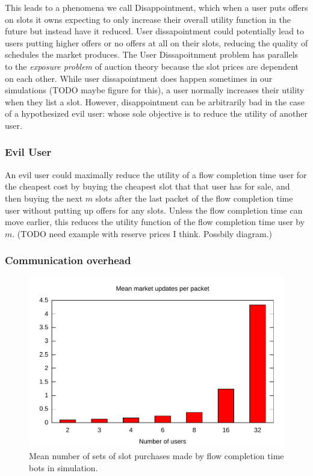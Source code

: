 This leads to a phenomena we call Disappointment, which when a user puts offers on slots it owns expecting to only increase their overall utility function in the future but instead have it reduced. User dissapointment could potentially lead to users putting higher offers or no offers at all on their slots, reducing the quality of schedules the market produces.
The User Dissapoitnment problem has parallels to the \emph{exposure problem} of auction theory \cite{milgrom00, englmaier06} because the slot prices are dependent on each other.
While user dissapointment does happen sometimes in our simulations (TODO maybe figure for this), a user normally increases their utility when they list a slot.
However, disappointment can be arbitrarily bad in the case of a hypothesized evil user: whose sole objective is to reduce the utility of another user.
\subsubsection{Evil User}
An evil user could maximally reduce the utility of a flow completion time user for the cheapest cost by buying the cheapest slot that that user has for sale, and then buying the next $m$ slots after the last packet of the flow completion time user without putting up offers for any slots. Unless the flow completion time can move earlier, this reduces the utility function of the flow completion time user by $m$. (TODO need example with reserve prices I think. Possbily diagram.)

\subsubsection{Communication overhead}

\begin{figure}
\includegraphics[width=\columnwidth]{plots/num_market_updates.pdf}
\caption{Mean number of sets of slot purchases made by flow completion time bots in simulation.}
\label{f:num_market_updates}
\end{figure}

